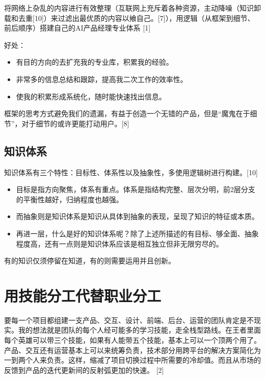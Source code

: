 \documentclass[letterpaper,11pt,english]{sphinxmanual}
\begin{document}
将网络上杂乱的内容进行有效整理（互联网上充斥着各种资源，主动降噪（知识卸载和去重{[}10{]}）来过滤出最优质的内容以飨自己。{[}7{]}），用逻辑（从框架到细节、前后顺序）搭建自己的AI产品经理专业体系
{[}1{]}

好处：
\begin{itemize}
\item {} 
有目的方向的去扩充我的专业库，积累我的经验。

\item {} 
非常多的信息总结和跟踪，提高我二次工作的效率性。

\item {} 
使我的积累形成系统化，随时能快速找出信息。

\end{itemize}

框架的思考方式避免我们的遗漏，有益于创造一个无错的产品，但是“魔鬼在于细节”，对于细节的或许更能打动用户。{[}8{]}


\section{知识体系}
\label{\detokenize{index:id2}}
知识体系有三个特性：目标性、体系性以及抽象性，多使用逻辑树进行构建。{[}10{]}
\begin{itemize}
\item {} 
目标是指方向聚焦，体系有重点。体系是指结构完整、层次分明，前2层分支的平衡性越好，归纳程度也越强。

\item {} 
而抽象则是知识体系是知识从具体到抽象的表现，呈现了知识的特征或本质。

\item {} 
再进一层，什么是好的知识体系呢？除了上述所描述的有目标、够全面、抽象程度高，还有一点则是知识体系应该是相互独立但非无限穷尽的。

\end{itemize}

有的知识仅须停留在知道，有的则需要运用并且创新。


\chapter{用技能分工代替职业分工}
\label{\detokenize{index:id3}}
要每一个项目都组建一支产品、交互、设计、前端、后台、运营的团队肯定是不现实。我的想法就是团队的每个人经可能多的学习技能，走全栈型路线。在王者里面每个英雄可以带三个技能，如果有人能带五个技能，基本上可以一个顶两个用了。产品、交互还有运营基本上可以来统筹负责，技术部分用跨平台的解决方案简化为一到两个人来负责。这样，缩减了项目切换过程中所需要的冷却值。而且从市场的反馈到产品的迭代更新间的反射弧更加的快速。
{[}2{]}
\end{document}
